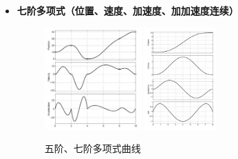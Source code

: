 \documentclass[../main.tex]{subfiles}
\begin{document}
\begin{enumerate}
\begin{enumerate}
\begin{itemize}
                    \item \textbf{七阶多项式（位置、速度、加速度、加加速度连续）}\\
                    \begin{figure}[htbp]
                        \centering
                        \includegraphics[width=0.35\textwidth]{images/5jie.png}
                        \includegraphics[width=0.26\textwidth]{images/7jie.png}
                        \caption{五阶、七阶多项式曲线}
                        \label{fig:bug2bad}
                    \end{figure}
                \end{itemize}
        \end{enumerate}


\end{enumerate}
\end{document}
